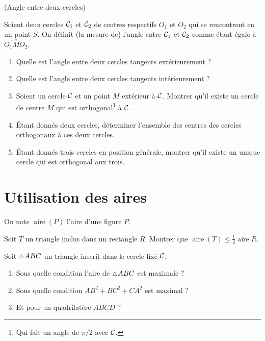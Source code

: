 \documentclass[a4paper,11pt,reqno]{amsart}
\DeclareMathOperator{\aire}{aire}
\begin{document}
\begin{exo} (Angle entre deux cercles)

  Soient deux cercles $\mathcal{C}_{1}$ et $\mathcal{C}_{2}$ de centres respectifs $O_{1}$ et $O_{2}$ qui se rencontrent en un point $S$. On définit (la mesure de) l'angle entre $\mathcal{C}_{1}$ et $\mathcal{C}_{2}$ comme étant égale à $\widehat{O_{1}MO_{2}}$.
  \begin{enumerate}
    \item Quelle est l'angle entre deux cercles tangents extérieurement ?
    \item Quelle est l'angle entre deux cercles tangents intérieurement ?
    \item Soient un cercle $\mathcal{C}$ et un point $M$ extérieur à $\mathcal{C}$. Montrer qu'il existe un cercle de centre $M$ qui est orthogonal\footnote{Qui fait un angle de $\pi/2$ avec $\mathcal{C}$.} à $\mathcal{C}$.
    \item Étant donnés deux cercles, déterminer l'ensemble des centres des cercles orthogonaux à ces deux cercles.
    \item Étant donnés trois cercles en position générale, montrer qu'il existe un unique cercle qui est orthogonal aux trois.
  \end{enumerate}
\end{exo}


\section{Utilisation des aires}

\begin{convention}
  On note $\aire (P)$ l'aire d'une figure $P$.
\end{convention}

\begin{exo}[.35]

  Soit $T$ un triangle inclus dans un rectangle $R$. Montrer que $\aire(T) \leqslant \frac{1}{2}\aire{R}$.
\end{exo}

\begin{exo}
  Soit $\tri ABC$ un triangle inscrit dans le cercle fixé $\mathcal{C}$.
  \begin{enumerate}
    \item Sous quelle condition l'aire de $\tri ABC$ est maximale ?
    \item Sous quelle condition $AB^{2}+BC^{2}+CA^{2}$ est maximal ?
    \item Et pour un quadrilatère $ABCD$ ?
  \end{enumerate}

\end{exo}
\end{document}
